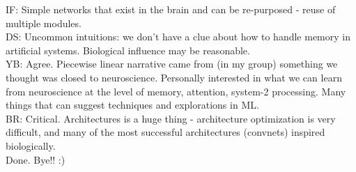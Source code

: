 \documentclass[12pt]{article}
\begin{document}
IF: Simple networks that exist in the brain and can be re-purposed - reuse of multiple modules. \\

DS: Uncommon intuitions: we don't have a clue about how to handle memory in artificial systems. Biological influence may be reasonable. \\

YB: Agree. Piecewise linear narrative came from (in my group) something we thought was closed to neuroscience. Personally interested in what we can learn from neuroscience at the level of memory, attention, system-2 processing. Many things that can suggest techniques and explorations in ML. \\

BR: Critical. Architectures is a huge thing - architecture optimization is very difficult, and many of the most successful architectures (convnets) inspired biologically. \\

Done. Bye!! :)



\end{document}

